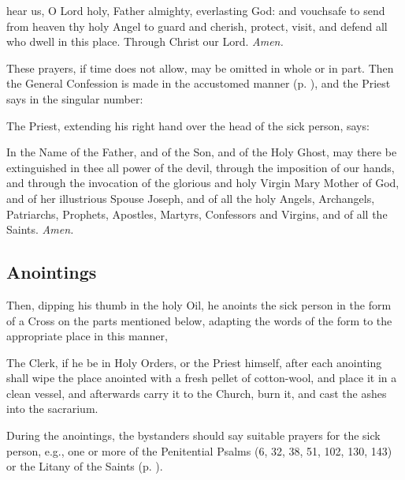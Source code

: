 \clearpage
{}
{} hear us, O Lord holy, Father almighty, everlasting God: and vouchsafe to send from heaven thy holy Angel to guard and cherish, protect, visit, and defend all who dwell in this place. Through Christ our Lord. \textit{Amen.}
\begin{rubric}
    These prayers, if time does not allow, may be omitted in whole or in part. Then the General Confession is made in the accustomed manner (p. \pageref{Confiteor}), and the Priest says in the singular number:
\end{rubric}
\begin{rubric}
    The Priest, extending his right hand over the head of the sick person, says:
\end{rubric}\par\noindent
In the Name of the {} Father, and of the {} Son, and of the {} Holy Ghost, may there be extinguished in thee all power of the devil, through the imposition of our hands, and through the invocation of the glorious and holy Virgin Mary Mother of God, and of her illustrious Spouse Joseph, and of all the holy Angels, Archangels, Patriarchs, Prophets, Apostles, Martyrs, Confessors and Virgins, and of all the Saints. \textit{Amen.}


\clearpage
\subsection{Anointings}
\begin{rubric}
    Then, dipping his thumb in the holy Oil, he anoints the sick person in the form of a Cross on the parts mentioned below, adapting the words of the form to the appropriate place in this manner,
\end{rubric}
\begin{rubric}
    The Clerk, if he be in Holy Orders, or the Priest himself, after each anointing shall wipe the place anointed with a fresh pellet of cotton-wool, and place it in a clean vessel, and afterwards carry it to the Church, burn it, and cast the ashes into the sacrarium.
\end{rubric}
\begin{rubric}
    During the anointings, the bystanders should say suitable prayers for the sick person, e.g., one or more of the Penitential Psalms (6, 32, 38, 51, 102, 130, 143) or the Litany of the Saints (p. \pageref{LitanySaints}).
\end{rubric}

